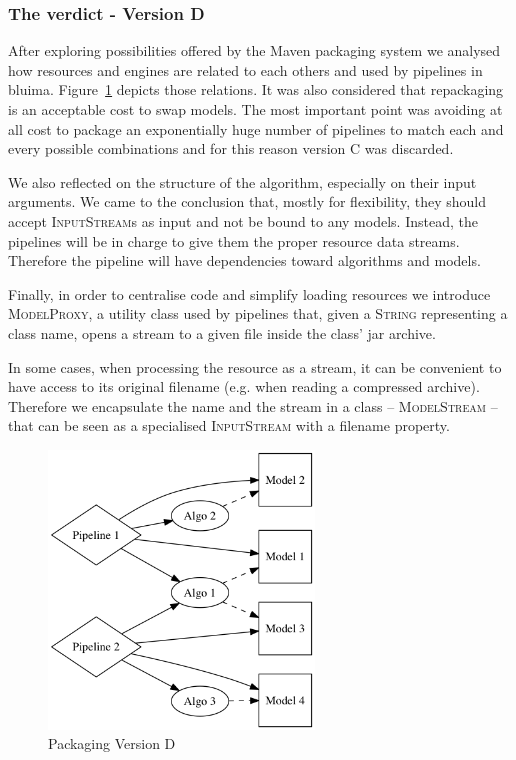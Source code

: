 \documentclass{article}
\newcommand{\ID}[1]{{\textsc{#1}}}
\begin{document}
\subsubsection{The verdict - Version D}

After exploring possibilities offered by the Maven packaging system we analysed how resources and engines are related to each others and used by pipelines in bluima. Figure~\ref{fig:pkgsysD} depicts those relations. It was also considered that repackaging is an acceptable cost to swap models. The most important point was avoiding at all cost to package an exponentially huge number of pipelines to match each and every possible combinations and for this reason version C was discarded.

We also reflected on the structure of the algorithm, especially on their input arguments. We came to the conclusion that, mostly for flexibility, they should accept \ID{InputStream}s as input and not be bound to any models. Instead, the pipelines will be in charge to give them the proper resource data streams. Therefore the pipeline will have dependencies toward algorithms and models.

Finally, in order to centralise code and simplify loading resources we introduce \ID{ModelProxy}, a utility class used by pipelines that, given a \ID{String} representing a class name, opens a stream to a given file inside the class' jar archive.

In some cases, when processing the resource as a stream, it can be convenient to have access to its original filename (e.g. when reading a compressed archive). Therefore we encapsulate the name and the stream in a class -- \ID{ModelStream} -- that can be seen as a specialised \ID{InputStream} with a filename property.

\begin{figure}
\centering
\includegraphics[width=200pt]{res/packaging_version_D.png}
\caption{Packaging Version D}
\label{fig:pkgsysD}
\end{figure}
\end{document}
